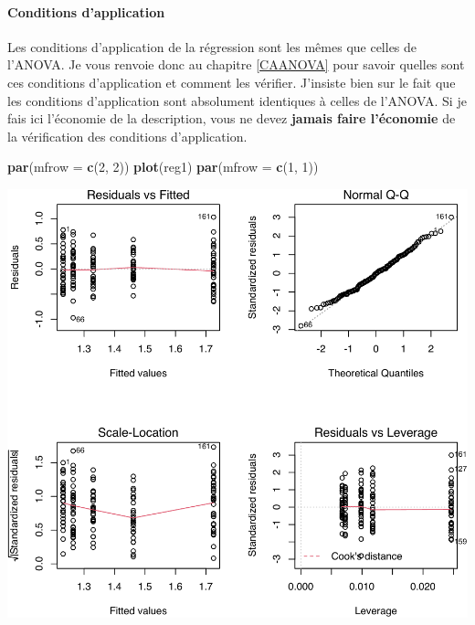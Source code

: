 \documentclass[
  a4paper,
]{article}
\newenvironment{Shaded}{\begin{snugshade}}{\end{snugshade}}
\newcommand{\DataTypeTok}[1]{\textcolor[rgb]{0.00,0.34,0.68}{#1}}
\newcommand{\DecValTok}[1]{\textcolor[rgb]{0.69,0.50,0.00}{#1}}
\newcommand{\KeywordTok}[1]{\textcolor[rgb]{0.12,0.11,0.11}{\textbf{#1}}}
\newcommand{\NormalTok}[1]{\textcolor[rgb]{0.12,0.11,0.11}{#1}}
\begin{document}
\hypertarget{conditions-dapplication-4}{%
\paragraph{Conditions d'application}\label{conditions-dapplication-4}}

Les conditions d'application de la régression sont les mêmes que celles de l'ANOVA. Je vous renvoie donc au chapitre \ref{CAANOVA} pour savoir quelles sont ces conditions d'application et comment les vérifier. J'insiste bien sur le fait que les conditions d'application sont absolument identiques à celles de l'ANOVA. Si je fais ici l'économie de la description, vous ne devez \textbf{jamais faire l'économie} de la vérification des conditions d'application.

\begin{Shaded}
\begin{Highlighting}[]
\KeywordTok{par}\NormalTok{(}\DataTypeTok{mfrow =} \KeywordTok{c}\NormalTok{(}\DecValTok{2}\NormalTok{, }\DecValTok{2}\NormalTok{))}
\KeywordTok{plot}\NormalTok{(reg1)}
\KeywordTok{par}\NormalTok{(}\DataTypeTok{mfrow =} \KeywordTok{c}\NormalTok{(}\DecValTok{1}\NormalTok{, }\DecValTok{1}\NormalTok{))}
\end{Highlighting}
\end{Shaded}

\begin{center}\includegraphics[width=0.9\linewidth]{figure/unnamed-chunk-123-1} \end{center}
\end{document}
